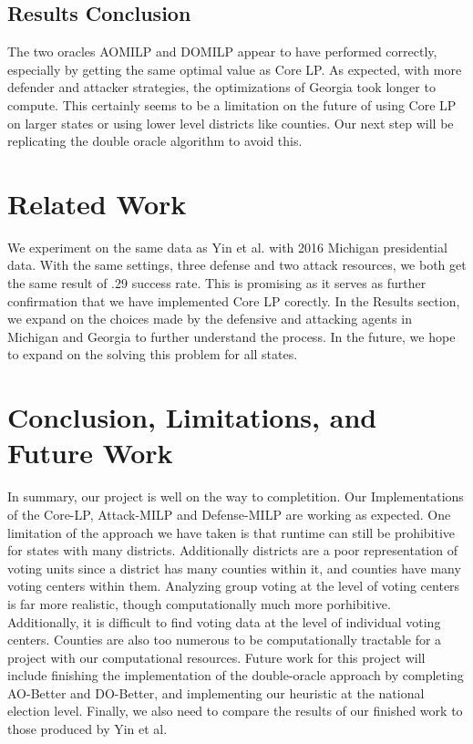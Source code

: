 \documentclass[letterpaper]{article} %
\begin{document}
\subsection{Results Conclusion}

The two oracles AOMILP and DOMILP appear to have performed correctly, especially by getting the same optimal value as Core LP. As expected, with more defender and attacker strategies, the optimizations of Georgia took longer to compute. This certainly seems to be a limitation on the future of using Core LP on larger states or using lower level districts like counties. Our next step will be replicating the double oracle algorithm to avoid this. 


\section{Related Work}

We experiment on the same data as Yin et al. with 2016 Michigan presidential data. With the same settings, three defense and two attack resources, we both get the same result of .29 success rate. This is promising as it serves as further confirmation that we have implemented Core LP corectly. In the Results section, we expand on the choices made by the defensive and attacking agents in Michigan and Georgia to further understand the process. In the future, we hope to expand on the solving this problem for all states. 

\section{Conclusion, Limitations, and Future Work}
In summary, our project is well on the way to completition. Our Implementations of the Core-LP, Attack-MILP and Defense-MILP are working as expected. One limitation of the approach we have taken is that runtime can still be prohibitive for states with many districts. Additionally districts are a poor representation of voting units since a district has many counties within it, and counties have many voting centers within them. Analyzing group voting at the level of voting centers is far more realistic, though computationally much more porhibitive. Additionally, it is difficult to find voting data at the level of individual voting centers. Counties are also too numerous to be computationally tractable for a project with our computational resources. Future work for this project will include finishing the implementation of the double-oracle approach by completing AO-Better and DO-Better, and implementing our heuristic at the national election level. Finally, we also need to compare the results of our finished work to those produced by Yin et al.
\end{document}
